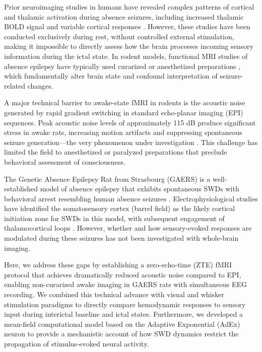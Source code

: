 \documentclass[12pt]{article}
\begin{document}
Prior neuroimaging studies in humans have revealed complex patterns of cortical and thalamic activation during absence seizures, including increased thalamic BOLD signal and variable cortical responses \citep{bai2010default}. However, these studies have been conducted exclusively during rest, without controlled external stimulation, making it impossible to directly assess how the brain processes incoming sensory information during the ictal state. In rodent models, functional MRI studies of absence epilepsy have typically used curarized or anesthetized preparations \citep{nersesyan2004remote}, which fundamentally alter brain state and confound interpretation of seizure-related changes.

A major technical barrier to awake-state fMRI in rodents is the acoustic noise generated by rapid gradient switching in standard echo-planar imaging (EPI) sequences. Peak acoustic noise levels of approximately 115 dB produce significant stress in awake rats, increasing motion artifacts and suppressing spontaneous seizure generation---the very phenomenon under investigation \citep{depaulis2016gaers}. This challenge has limited the field to anesthetized or paralyzed preparations that preclude behavioral assessment of consciousness.

The Genetic Absence Epilepsy Rat from Strasbourg (GAERS) is a well-established model of absence epilepsy that exhibits spontaneous SWDs with behavioral arrest resembling human absence seizures \citep{depaulis2016gaers}. Electrophysiological studies have identified the somatosensory cortex (barrel field) as the likely cortical initiation zone for SWDs in this model, with subsequent engagement of thalamocortical loops \citep{meeren2002cortical, polack2007deep}. However, whether and how sensory-evoked responses are modulated during these seizures has not been investigated with whole-brain imaging.

Here, we address these gaps by establishing a zero-echo-time (ZTE) fMRI protocol that achieves dramatically reduced acoustic noise compared to EPI, enabling non-curarized awake imaging in GAERS rats with simultaneous EEG recording. We combined this technical advance with visual and whisker stimulation paradigms to directly compare hemodynamic responses to sensory input during interictal baseline and ictal states. Furthermore, we developed a mean-field computational model based on the Adaptive Exponential (AdEx) neuron to provide a mechanistic account of how SWD dynamics restrict the propagation of stimulus-evoked neural activity.
\end{document}
